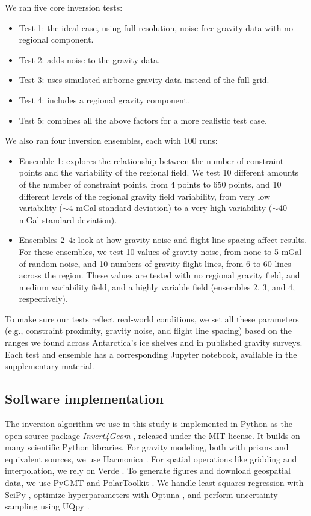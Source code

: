\documentclass[tc, manuscript]{copernicus}
\begin{document}
We ran five core inversion tests:
\begin{itemize}
    \item Test 1: the ideal case, using full-resolution, noise-free gravity data with no regional component.
    \item Test 2: adds noise to the gravity data.
    \item Test 3: uses simulated airborne gravity data instead of the full grid.
    \item Test 4: includes a regional gravity component.
    \item Test 5: combines all the above factors for a more realistic test case.
\end{itemize}

We also ran four inversion ensembles, each with 100 runs:
\begin{itemize}
    \item Ensemble 1: explores the relationship between the number of constraint points and the variability of the regional field. We test 10 different amounts of the number of constraint points, from 4 points to 650 points, and 10 different levels of the regional gravity field variability, from very low variability ($\sim$4 mGal standard deviation) to a very high variability ($\sim$40 mGal standard deviation).
    \item Ensembles 2–4: look at how gravity noise and flight line spacing affect results. For these ensembles, we test 10 values of gravity noise, from none to 5 mGal of random noise, and 10 numbers of gravity flight lines, from 6 to 60 lines across the region. These values are tested with no regional gravity field, and medium variability field, and a highly variable field (ensembles 2, 3, and 4, respectively).
\end{itemize}

To make sure our tests reflect real-world conditions, we set all these parameters (e.g., constraint proximity, gravity noise, and flight line spacing) based on the ranges we found across Antarctica's ice shelves and in published gravity surveys. Each test and ensemble has a corresponding Jupyter notebook, available in the supplementary material.

\subsection{Software implementation}
The inversion algorithm we use in this study is implemented in Python as the open-source package \textit{Invert4Geom} \citep{invert4geomcommunityinvert4geom2025}, released under the MIT license. It builds on many scientific Python libraries. For gravity modeling, both with prisms and equivalent sources, we use Harmonica \citep{fatiandoaterraprojectharmonica2024, solergradientboosted2021}. For spatial operations like gridding and interpolation, we rely on Verde \citep{uiedaverde2018}. To generate figures and download geospatial data, we use PyGMT and PolarToolkit \citep{uiedapygmt2021, tankersleypolartoolkit2024, polartoolkitcommunitypolartoolkit2025}. We handle least squares regression with SciPy \citep{virtanenscipy2020}, optimize hyperparameters with Optuna \citep{akibaoptuna2019}, and perform uncertainty sampling using UQpy \citep{olivieruqpy2020}.
\end{document}
